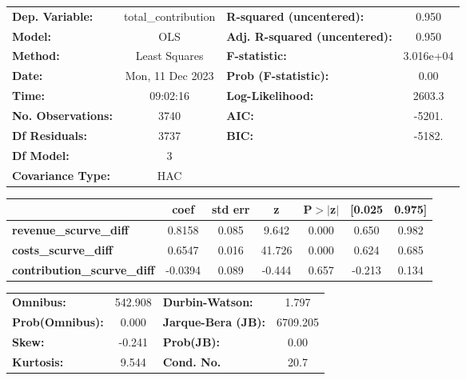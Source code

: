 \begin{center}
\begin{tabular}{lclc}
\toprule
\textbf{Dep. Variable:}             & total\_contribution & \textbf{  R-squared (uncentered):}      &     0.950   \\
\textbf{Model:}                     &         OLS         & \textbf{  Adj. R-squared (uncentered):} &     0.950   \\
\textbf{Method:}                    &    Least Squares    & \textbf{  F-statistic:       }          & 3.016e+04   \\
\textbf{Date:}                      &   Mon, 11 Dec 2023  & \textbf{  Prob (F-statistic):}          &     0.00    \\
\textbf{Time:}                      &       09:02:16      & \textbf{  Log-Likelihood:    }          &    2603.3   \\
\textbf{No. Observations:}          &          3740       & \textbf{  AIC:               }          &    -5201.   \\
\textbf{Df Residuals:}              &          3737       & \textbf{  BIC:               }          &    -5182.   \\
\textbf{Df Model:}                  &             3       & \textbf{                     }          &             \\
\textbf{Covariance Type:}           &         HAC         & \textbf{                     }          &             \\
\bottomrule
\end{tabular}
\begin{tabular}{lcccccc}
                                    & \textbf{coef} & \textbf{std err} & \textbf{z} & \textbf{P$> |$z$|$} & \textbf{[0.025} & \textbf{0.975]}  \\
\midrule
\textbf{revenue\_scurve\_diff}      &       0.8158  &        0.085     &     9.642  &         0.000        &        0.650    &        0.982     \\
\textbf{costs\_scurve\_diff}        &       0.6547  &        0.016     &    41.726  &         0.000        &        0.624    &        0.685     \\
\textbf{contribution\_scurve\_diff} &      -0.0394  &        0.089     &    -0.444  &         0.657        &       -0.213    &        0.134     \\
\bottomrule
\end{tabular}
\begin{tabular}{lclc}
\textbf{Omnibus:}       & 542.908 & \textbf{  Durbin-Watson:     } &    1.797  \\
\textbf{Prob(Omnibus):} &   0.000 & \textbf{  Jarque-Bera (JB):  } & 6709.205  \\
\textbf{Skew:}          &  -0.241 & \textbf{  Prob(JB):          } &     0.00  \\
\textbf{Kurtosis:}      &   9.544 & \textbf{  Cond. No.          } &     20.7  \\
\bottomrule
\end{tabular}
\end{center}